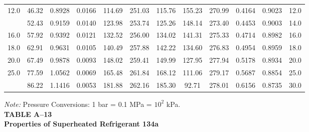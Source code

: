 \documentclass[12pt,a3paper]{article}
\begin{document}
\begin{enumerate}
\begin{center}
\begin{longtable}{c c c c c c c c c c c c}
12.0 & 46.32 & 0.8928 & 0.0166 & 114.69 & 251.03 & 115.76 & 155.23 & 270.99 & 0.4164 & 0.9023 & 12.0 \\
\addlinespace
14.0 & 52.43 & 0.9159 & 0.0140 & 123.98 & 253.74 & 125.26 & 148.14 & 273.40 & 0.4453 & 0.9003 & 14.0 \\
16.0 & 57.92 & 0.9392 & 0.0121 & 132.52 & 256.00 & 134.02 & 141.31 & 275.33 & 0.4714 & 0.8982 & 16.0 \\
18.0 & 62.91 & 0.9631 & 0.0105 & 140.49 & 257.88 & 142.22 & 134.60 & 276.83 & 0.4954 & 0.8959 & 18.0 \\
20.0 & 67.49 & 0.9878 & 0.0093 & 148.02 & 259.41 & 149.99 & 127.95 & 277.94 & 0.5178 & 0.8934 & 20.0 \\
25.0 & 77.59 & 1.0562 & 0.0069 & 165.48 & 261.84 & 168.12 & 111.06 & 279.17 & 0.5687 & 0.8854 & 25.0 \\
\addlinespace
30.0 & 86.22 & 1.1416 & 0.0053 & 181.88 & 262.16 & 185.30 & 92.71 & 278.01 & 0.6156 & 0.8735 & 30.0 \\
\end{longtable}
\end{center}

\vspace{0.1cm}
\noindent\footnotesize \textit{Note:} Pressure Conversions: 1 bar = 0.1 MPa = $10^2$ kPa. \\

\noindent\textbf{\Large TABLE A--13} \\
\noindent\textbf{\large Properties of Superheated Refrigerant 134a}
\vspace{0.3cm}


\end{enumerate}
\end{document}
